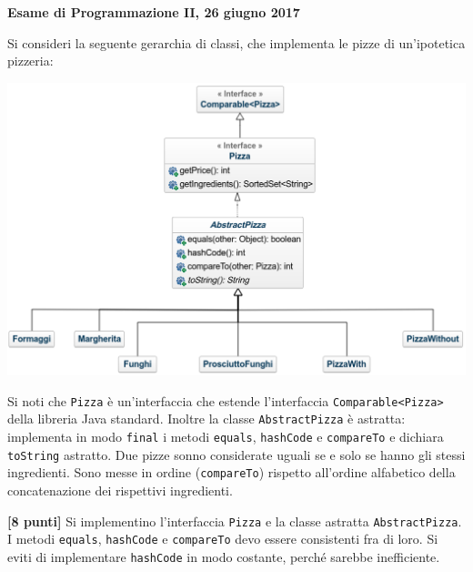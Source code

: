 \documentclass{article}[10pt]
\newcounter{esnu}
\newenvironment{esercizio}{\medskip \noindent {\bf Esercizio\addtocounter{esnu}{1} \arabic{esnu}}}{}
\begin{document}
\begin{center} {\bf Esame di Programmazione II, 26 giugno 2017}\end{center}

Si consideri la seguente gerarchia di classi, che implementa le pizze
di un'ipotetica pizzeria:

\begin{center}
  \includegraphics[scale=.35,clip=false]{hierarchy.png}
\end{center}

\noindent
Si noti che \texttt{Pizza} \`e un'interfaccia che estende
l'interfaccia \texttt{Comparable<Pizza>} della libreria Java standard.
Inoltre la classe \texttt{AbstractPizza} \`e astratta: implementa
in modo \texttt{final} i metodi
\texttt{equals}, \texttt{hashCode} e \texttt{compareTo} e dichiara
\texttt{toString} astratto. Due pizze sonno considerate uguali se e solo se
hanno gli stessi ingredienti. Sono messe in ordine (\texttt{compareTo}) rispetto
all'ordine alfabetico della concatenazione dei rispettivi ingredienti.

\begin{esercizio}
\textbf{[8 punti]}
Si implementino l'interfaccia \texttt{Pizza} e la classe astratta
\texttt{AbstractPizza}.
I metodi \texttt{equals}, \texttt{hashCode} e \texttt{compareTo}
devo essere consistenti fra di loro. Si eviti di implementare
\texttt{hashCode} in modo costante, perch\'e sarebbe inefficiente.
\end{esercizio}
\end{document}
